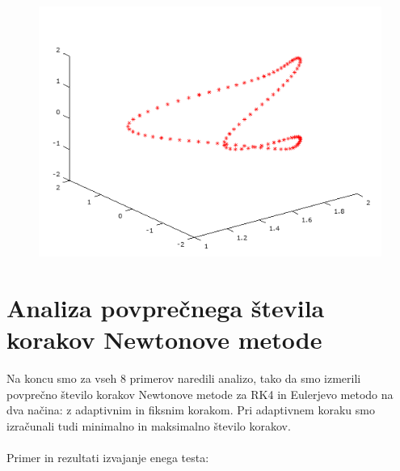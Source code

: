\documentclass[12pt]{article}
\begin{document}
\begin{minipage}{\textwidth}
\begin{figure}[H]
			\includegraphics[scale=0.5]{primer8_4} 
		\end{figure} 
	\end{minipage}
	\newpage
	\section{Analiza povprečnega števila korakov Newtonove metode} 
	Na koncu smo za vseh 8 primerov naredili analizo, tako da smo izmerili povprečno število korakov Newtonove metode za RK4 in Eulerjevo metodo na dva načina: z adaptivnim in fiksnim korakom. Pri adaptivnem koraku smo izračunali tudi minimalno in maksimalno število korakov.\\ \\
	Primer in rezultati izvajanje enega testa: 
	
\end{document}
